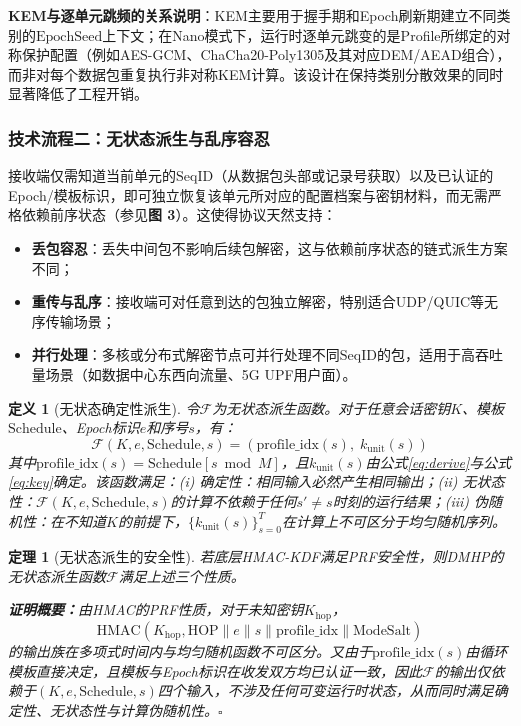 ﻿\documentclass[12pt,a4paper]{article}
\newtheorem{theorem}{定理}
\newtheorem{definition}{定义}
\begin{document}
\textbf{KEM与逐单元跳频的关系说明}：KEM主要用于握手期和Epoch刷新期建立不同类别的$\text{EpochSeed}$上下文；在Nano模式下，运行时逐单元跳变的是Profile所绑定的对称保护配置（例如AES-GCM、ChaCha20-Poly1305及其对应DEM/AEAD组合），而非对每个数据包重复执行非对称KEM计算。该设计在保持类别分散效果的同时显著降低了工程开销。

\subsubsection*{技术流程二：无状态派生与乱序容忍}

接收端仅需知道当前单元的$\text{SeqID}$（从数据包头部或记录号获取）以及已认证的Epoch/模板标识，即可独立恢复该单元所对应的配置档案与密钥材料，而无需严格依赖前序状态（参见\textbf{图 3}）。这使得协议天然支持：

\begin{itemize}
    \item \textbf{丢包容忍}：丢失中间包不影响后续包解密，这与依赖前序状态的链式派生方案不同；
    \item \textbf{重传与乱序}：接收端可对任意到达的包独立解密，特别适合UDP/QUIC等无序传输场景；
    \item \textbf{并行处理}：多核或分布式解密节点可并行处理不同$\text{SeqID}$的包，适用于高吞吐量场景（如数据中心东西向流量、5G UPF用户面）。
\end{itemize}

\begin{definition}[无状态确定性派生]
令$\mathcal{F}$为无状态派生函数。对于任意会话密钥$K$、模板$\text{Schedule}$、Epoch标识$e$和序号$s$，有：
\[
\mathcal{F}(K, e, \text{Schedule}, s) = (\text{profile\_idx}(s), \; k_{\text{unit}}(s))
\]
其中$\text{profile\_idx}(s)=\text{Schedule}[s \bmod M]$，且$k_{\text{unit}}(s)$由公式\eqref{eq:derive}与公式\eqref{eq:key}确定。该函数满足：(i) 确定性：相同输入必然产生相同输出；(ii) 无状态性：$\mathcal{F}(K,e,\text{Schedule},s)$的计算不依赖于任何$s' \neq s$时刻的运行结果；(iii) 伪随机性：在不知道$K$的前提下，$\{k_{\text{unit}}(s)\}_{s=0}^{T}$在计算上不可区分于均匀随机序列。
\end{definition}

\begin{theorem}[无状态派生的安全性]
若底层HMAC-KDF满足PRF安全性，则DMHP的无状态派生函数$\mathcal{F}$满足上述三个性质。

{\normalfont\textbf{证明概要：}}由HMAC的PRF性质，对于未知密钥$K_{\text{hop}}$，
\[
\text{HMAC}(K_{\text{hop}}, \text{HOP} \| e \| s \| \text{profile\_idx} \| \text{ModeSalt})
\]
的输出族在多项式时间内与均匀随机函数不可区分。又由于$\text{profile\_idx}(s)$由循环模板直接决定，且模板与Epoch标识在收发双方均已认证一致，因此$\mathcal{F}$的输出仅依赖于$(K,e,\text{Schedule},s)$四个输入，不涉及任何可变运行时状态，从而同时满足确定性、无状态性与计算伪随机性。$\square$
\end{theorem}
\end{document}
